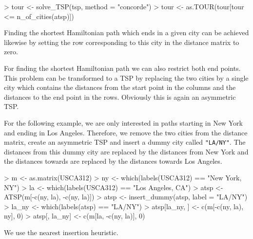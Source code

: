 \documentclass[10pt,a4paper,fleqn]{article}
\newcommand{\code}[1]{\mbox{\texttt{#1}}}
\begin{document}
\begin{Schunk}
\begin{Sinput}
> tour <- solve_TSP(tsp, method = "concorde")
> tour <- as.TOUR(tour[tour <= n_of_cities(atsp)])
\end{Sinput}
\end{Schunk}


Finding the shortest Hamiltonian path which ends in a given city can be achieved
likewise by setting the row corresponding to this city in the distance
matrix to zero.

For finding the shortest Hamiltonian path we can also restrict both end points.
This problem can be transformed to a TSP by replacing the two cities by a
single city which contains the distances from the start point in the columns
and the distances to the end point in the rows. Obviously this is again an
asymmetric TSP.

For the following example, we are only interested in paths starting in New York
and ending in Los Angeles. Therefore, we remove the two cities from the
distance matrix, create an asymmetric TSP and insert a dummy city called
\code{"LA/NY"}. The distances from this dummy city are replaced by the
distances from New York and the distances towards are replaced by the distances
towards Los Angeles.



\begin{Schunk}
\begin{Sinput}
> m <- as.matrix(USCA312)
> ny <- which(labels(USCA312) == "New York, NY")
> la <- which(labels(USCA312) == "Los Angeles, CA")
> atsp <- ATSP(m[-c(ny, la), -c(ny, la)])
> atsp <- insert_dummy(atsp, label = "LA/NY")
> la_ny <- which(labels(atsp) == "LA/NY")
> atsp[la_ny, ] <- c(m[-c(ny, la), ny], 0)
> atsp[, la_ny] <- c(m[la, -c(ny, la)], 0)
\end{Sinput}
\end{Schunk}

We use the nearest insertion heuristic.
\end{document}

